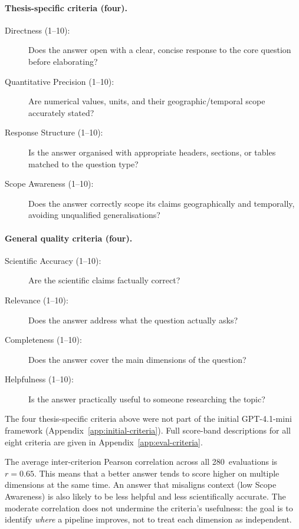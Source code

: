 \paragraph{Thesis-specific criteria (four).}
\begin{description}
\item[Directness (1--10):] Does the answer open with a clear, concise response to the core question before elaborating?
\item[Quantitative Precision (1--10):] Are numerical values, units, and their geographic/temporal scope accurately stated?
\item[Response Structure (1--10):] Is the answer organised with appropriate headers, sections, or tables matched to the question type?
\item[Scope Awareness (1--10):] Does the answer correctly scope its claims geographically and temporally, avoiding unqualified generalisations?
\end{description}

\paragraph{General quality criteria (four).}
\begin{description}
\item[Scientific Accuracy (1--10):] Are the scientific claims factually correct?
\item[Relevance (1--10):] Does the answer address what the question actually asks?
\item[Completeness (1--10):] Does the answer cover the main dimensions of the question?
\item[Helpfulness (1--10):] Is the answer practically useful to someone researching the topic?
\end{description}

The four thesis-specific criteria above were not part of the initial GPT-4.1-mini framework (Appendix~\ref{app:initial-criteria}). Full score-band descriptions for all eight criteria are given in Appendix~\ref{app:eval-criteria}.

The average inter-criterion Pearson correlation across all 280~evaluations is $r = 0.65$. This means that a better answer tends to score higher on multiple dimensions at the same time. An answer that misaligns context (low Scope Awareness) is also likely to be less helpful and less scientifically accurate. The moderate correlation does not undermine the criteria's usefulness: the goal is to identify \emph{where} a pipeline improves, not to treat each dimension as independent.


